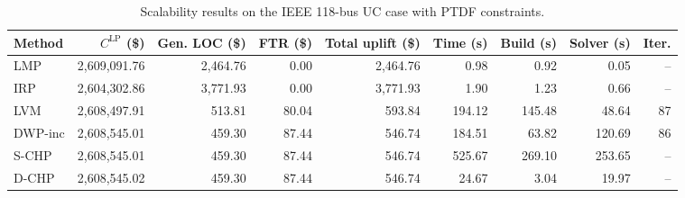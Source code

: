 \begin{table}[t]
\centering
\caption{Scalability results on the IEEE 118-bus UC case with PTDF constraints.}
\label{tab:scalability-118}
\scriptsize
\begin{tabular}{lrrrrrrrr}
\toprule
Method & $C^{\mathrm{LP}}$ (\$) & Gen. LOC (\$) & FTR (\$) & Total uplift (\$) & Time (s) & Build (s) & Solver (s) & Iter. \\
\midrule
LMP & 2,609,091.76 & 2,464.76 & 0.00 & 2,464.76 & 0.98 & 0.92 & 0.05 & -- \\
IRP & 2,604,302.86 & 3,771.93 & 0.00 & 3,771.93 & 1.90 & 1.23 & 0.66 & -- \\
LVM & 2,608,497.91 & 513.81 & 80.04 & 593.84 & 194.12 & 145.48 & 48.64 & 87 \\
DWP-inc & 2,608,545.01 & 459.30 & 87.44 & 546.74 & 184.51 & 63.82 & 120.69 & 86 \\
S-CHP & 2,608,545.01 & 459.30 & 87.44 & 546.74 & 525.67 & 269.10 & 253.65 & -- \\
D-CHP & 2,608,545.02 & 459.30 & 87.44 & 546.74 & 24.67 & 3.04 & 19.97 & -- \\
\bottomrule
\end{tabular}
\end{table}
